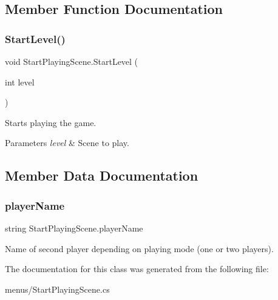\subsection{Member Function Documentation}
\mbox{\label{class_start_playing_scene_a410c9893df6067ef27fb4fc2ce7f5394}} 
\subsubsection{\texorpdfstring{Start\+Level()}{StartLevel()}}
{\footnotesize\ttfamily void Start\+Playing\+Scene.\+Start\+Level (\begin{DoxyParamCaption}\item[{int}]{level }\end{DoxyParamCaption})}



Starts playing the game. 


\begin{DoxyParams}{Parameters}
{\em level} & Scene to play.\\
\hline
\end{DoxyParams}


\subsection{Member Data Documentation}
\mbox{\label{class_start_playing_scene_aa349cb151f74693c91d971c2a6a20b26}} 
\subsubsection{\texorpdfstring{player\+Name}{playerName}}
{\footnotesize\ttfamily string Start\+Playing\+Scene.\+player\+Name\hspace{0.3cm}{\ttfamily [static]}}



Name of second player depending on playing mode (one or two players). 



The documentation for this class was generated from the following file\+:\begin{DoxyCompactItemize}
\item 
menus/Start\+Playing\+Scene.\+cs\end{DoxyCompactItemize}
